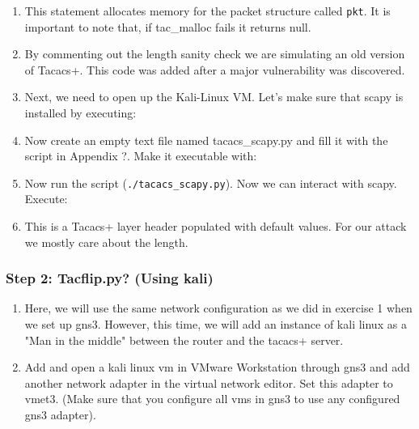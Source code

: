 \documentclass[main.tex]{subfiles}
\begin{document}
\begin{itemize}
\begin{enumerate}[noitemsep,label=$\bullet$,leftmargin=20mm,labelsep=0.5cm]

\item This statement allocates memory for the packet structure called \texttt{pkt}. It is important to note that, if tac\_malloc fails it returns null.

\item By commenting out the length sanity check we are simulating an old version of Tacacs+. This code was added after a major vulnerability was discovered.

\item Next, we need to open up the Kali-Linux VM. Let's make sure that scapy is installed by executing:


\item Now create an empty text file named tacacs\_scapy.py and fill it with the script in Appendix ?. Make it executable with:


\item Now run the script (\texttt{./tacacs\_scapy.py}). Now we can interact with scapy. Execute:


\item This is a Tacacs+ layer header populated with default values. For our attack we mostly care about the length.



\end{enumerate}


\subsubsection{Step 2: Tacflip.py? (Using kali)}
\begin{enumerate}[noitemsep,label=$\bullet$,leftmargin=20mm,labelsep=0.5cm]    

\item Here, we will use the same network configuration as we did in exercise 1 when we set up gns3. However, this time, we will add an instance of kali linux as a "Man in the middle" between the router and the tacacs+ server.

\item Add and open a kali linux vm in VMware Workstation through gns3 and add another network adapter in the virtual network editor. Set this adapter to vmet3. (Make sure that you configure all vms in gns3 to use any configured gns3 adapter).


\end{enumerate}
\end{itemize}
\end{document}
